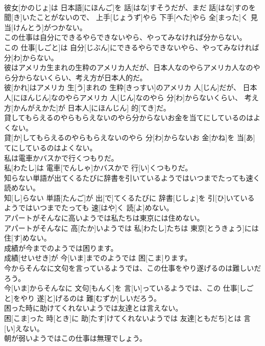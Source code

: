 \documentclass[8pt]{extreport}
\begin{document}
\begin{CJK}{UTF8}{min}
\\	彼女[かのじょ]は 日本語[にほんご]を 話[はな]すそうだが、まだ 話[はな]すのを 聞[き]いたことがないので、 上手[じょうず]やら 下手[へた]やら 全[まった]く 見当[けんとう]がつかない。
\\	この仕事は自分にできるやらできないやら、やってみなければ分からない。	
\\	この 仕事[しごと]は 自分[じぶん]にできるやらできないやら、やってみなければ 分[わ]からない。
\\	彼はアメリカ生まれの生粋のアメリカ人だが、日本人なのやらアメリカ人なのやら分からないくらい、考え方が日本人的だ。	
\\	彼[かれ]はアメリカ 生[う]まれの 生粋[きっすい]のアメリカ 人[じん]だが、 日本人[にほんじん]なのやらアメリカ 人[じん]なのやら 分[わ]からないくらい、 考え方[かんがえかた]が 日本人[にほんじん] 的[てき]だ。
\\	貸してもらえるのやらもらえないのやら分からないお金を当てにしているのはよくない。	
\\	貸[か]してもらえるのやらもらえないのやら 分[わ]からないお 金[かね]を 当[あ]てにしているのはよくない。
\\	私は電車かバスかで行くつもりだ。	
\\	私[わたし]は 電車[でんしゃ]かバスかで 行[い]くつもりだ。
\\	知らない単語が出てくるたびに辞書を引いているようではいつまでたっても速く読めない。	
\\	知[し]らない 単語[たんご]が 出[で]てくるたびに 辞書[じしょ]を 引[ひ]いているようではいつまでたっても 速[はや]く 読[よ]めない。
\\	アパートがそんなに高いようでは私たちは東京には住めない。	
\\	アパートがそんなに 高[たか]いようでは 私[わたし]たちは 東京[とうきょう]には 住[す]めない。
\\	成績が今までのようでは困ります。	
\\	成績[せいせき]が 今[いま]までのようでは 困[こま]ります。
\\	今からそんなに文句を言っているようでは、この仕事をやり遂げるのは難しいだろう。	
\\	今[いま]からそんなに 文句[もんく]を 言[い]っているようでは、この 仕事[しごと]をやり 遂[と]げるのは 難[むずか]しいだろう。
\\	困った時に助けてくれないようでは友達とは言えない。	
\\	困[こま]った 時[とき]に 助[たす]けてくれないようでは 友達[ともだち]とは 言[い]えない。
\\	朝が弱いようではこの仕事は無理でしょう。	

\end{CJK}
\end{document}

